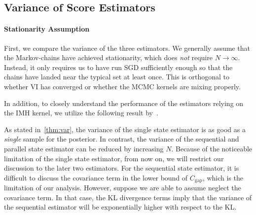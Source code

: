 \vspace{-0.05in}
\subsection{Variance of Score Estimators}\label{section:var}
\paragraph{Stationarity Assumption}
First, we compare the variance of the three estimators.
We generally assume that the Markov-chains have achieved stationarity, which does \textit{not} require \(N \rightarrow \infty\).
Instead, it only requires us to have run SGD sufficiently enough so that the chains have landed near the typical set at least once.
This is orthogonal to whether VI has converged or whether the MCMC kernels are mixing properly.

In addition, to closely understand the performance of the estimators relying on the IMH kernel, we utilize the following result by~\citet{Smith96exacttransition}.


%
%


As stated in~\cref{thm:var}, the variance of the single state estimator is as good as a \textit{single} sample for the posterior.
In contrast, the variance of the sequential and parallel state estimator can be reduced by increasing \(N\).
Because of the noticeable limitation of the single state estimator, from now on, we will restrict our discussion to the later two estimators.
For the sequential state estimator, it is difficult to discuss the covariance term in the lower bound of \(C_{\text{gap}}\), which is the limitation of our analysis.
However, suppose we are able to assume neglect the covariance term. In that case, the KL divergence terms imply that the variance of the sequential estimator will be exponentially higher with respect to the KL.

